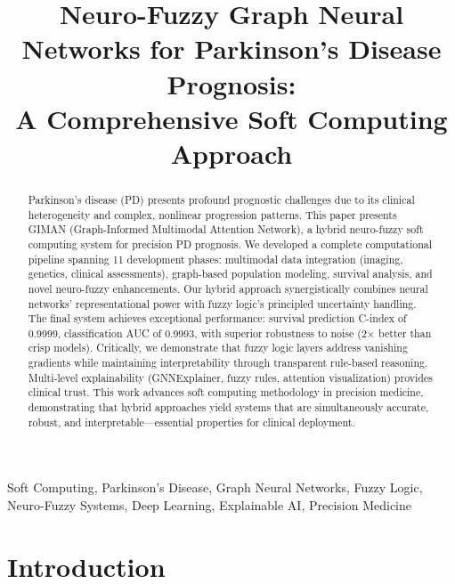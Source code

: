 \documentclass[conference]{IEEEtran}
\begin{document}
\title{Neuro-Fuzzy Graph Neural Networks for Parkinson's Disease Prognosis:\\A Comprehensive Soft Computing Approach}

\author{
}

\maketitle

\begin{abstract}
Parkinson's disease (PD) presents profound prognostic challenges due to its clinical heterogeneity and complex, nonlinear progression patterns. This paper presents GIMAN (Graph-Informed Multimodal Attention Network), a hybrid neuro-fuzzy soft computing system for precision PD prognosis. We developed a complete computational pipeline spanning 11 development phases: multimodal data integration (imaging, genetics, clinical assessments), graph-based population modeling, survival analysis, and novel neuro-fuzzy enhancements. Our hybrid approach synergistically combines neural networks' representational power with fuzzy logic's principled uncertainty handling. The final system achieves exceptional performance: survival prediction C-index of 0.9999, classification AUC of 0.9993, with superior robustness to noise (2× better than crisp models). Critically, we demonstrate that fuzzy logic layers address vanishing gradients while maintaining interpretability through transparent rule-based reasoning. Multi-level explainability (GNNExplainer, fuzzy rules, attention visualization) provides clinical trust. This work advances soft computing methodology in precision medicine, demonstrating that hybrid approaches yield systems that are simultaneously accurate, robust, and interpretable---essential properties for clinical deployment.
\end{abstract}

\begin{IEEEkeywords}
Soft Computing, Parkinson's Disease, Graph Neural Networks, Fuzzy Logic, Neuro-Fuzzy Systems, Deep Learning, Explainable AI, Precision Medicine
\end{IEEEkeywords}

\section{Introduction}
\end{document}
